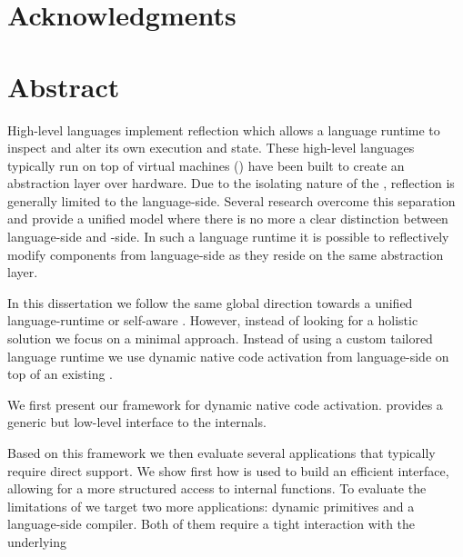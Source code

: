 \documentclass[a4paper,11pt,twoside]{include/ThesisStyle}
\begin{document}


\dominitoc

\cleardoublepage
\chapter*{Acknowledgments}


\cleardoublepage
\chapter*{Abstract}
High-level languages implement reflection which allows a language runtime to inspect and alter its own execution and state.
These high-level languages typically run on top of virtual machines (\VMs) have been built to create an abstraction layer over hardware.
Due to the isolating nature of the \VM, reflection is generally limited to the language-side.
Several research \VMs overcome this separation and provide a unified model where there is no more a clear distinction between language-side and \VM-side.
In such a language runtime it is possible to reflectively modify \VM components from language-side as they reside on the same abstraction layer.

In this dissertation we follow the same global direction towards a unified language-runtime or self-aware \VM.
However, instead of looking for a holistic solution we focus on a minimal approach.
Instead of using a custom tailored language runtime we use dynamic native code activation from language-side on top of an existing \VM.

We first present \B our framework for dynamic native code activation.
\B provides a generic but low-level interface to the \VM internals.

Based on this framework we then evaluate several applications that typically require direct \VM support.
We show first how \B is used to build an efficient \FFI interface, allowing for a more structured access to \VM internal functions.
To evaluate the limitations of \B we target two more applications: dynamic primitives and a language-side \JIT compiler.
Both of them require a tight interaction with the underlying \VM
\end{document}
